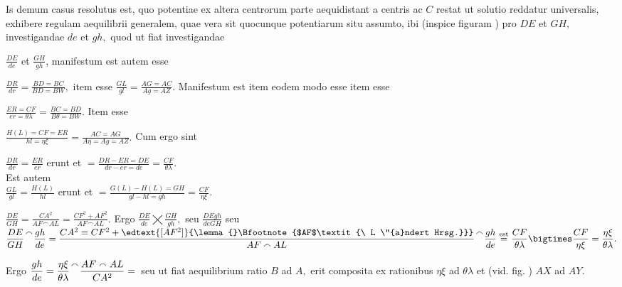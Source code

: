 \pstart
Is demum casus resolutus est, quo potentiae\protect{} ex altera centrorum parte aequidistant a centris ac $C$ restat ut solutio reddatur universalis, exhibere regulam aequilibrii\protect{} generalem, quae vera sit quocunque potentiarum\protect{} situ assumto, ibi (inspice figuram ) pro  $DE$ et $GH,$ investigandae $de$ et $gh,$ quod ut fiat investigandae \rule[-4mm]{0mm}{10mm}$\displaystyle\frac{DE}{de}$ et $\displaystyle\frac{GH}{gh}$, manifestum est autem esse \rule[-4mm]{0mm}{10mm}$\displaystyle\frac{DR}{dr}=\frac{BD=BC}{BD=BW},$ item esse $\displaystyle\frac{GL}{gl}=\frac{AG=AC}{Ag=AZ}.$ Manifestum est item eodem modo esse item esse \rule[-4mm]{0mm}{10mm}$\displaystyle\frac{ER=CF}{er=\theta\lambda}=\frac{BC=BD}{B\theta=BW}.$  
Item esse \rule[-4mm]{0mm}{10mm}$\displaystyle\frac{H(L)=CF=ER}{hl=\eta\xi}=\frac{AC=AG}{A\eta=Ag=AZ}.$
\pend
\pstart\noindent
\hspace*{0.7cm}Cum ergo sint \rule[-4mm]{0mm}{10mm}$\displaystyle\frac{DR}{dr}=\frac{ER}{er}$\hspace*{0.3cm} erunt et $\displaystyle=\frac{DR-ER=DE}{dr-er=de}=\frac{CF}{\theta\lambda}.$\\
\hspace*{11.5cm}Est autem\\
\hspace*{0.7cm} $\displaystyle\frac{GL}{gl}=\frac{H(L)}{hl}$ erunt et $\displaystyle=\frac{G(L)-H(L)=GH}{gl-hl=gh}=\frac{CF}{\eta\xi}.$
\pend
\vspace*{1mm}
\pstart \noindent
\rule[-4mm]{0mm}{10mm}$\displaystyle\frac{DE}{GH}=\frac{CA^2}{AF\smallfrown AL}=\frac{CF^2+AF^2}{AF\smallfrown AL}.$
Ergo $\displaystyle\frac{DE}{de}\bigtimes\frac{GH}{gh},$ seu $\displaystyle\frac{DEgh}{deGH}$ seu $\displaystyle\frac{DE}{GH}\efrac{\smallfrown}{}\frac{gh}{de}=\frac{CA^2=CF^2+\edtext{\lbrack AF^2\rbrack}{\lemma{}\Bfootnote{$AF$\textit{\ L \"{a}ndert Hrsg.}}}}{AF\smallfrown AL}\efrac{\smallfrown}{}\frac{gh}{de}\overset{\text{est}}=\frac{CF}{\theta\lambda}\bigtimes\frac{CF}{\eta\xi}=\frac{\eta\xi}{\theta\lambda}.$ 
\rule[-4mm]{0mm}{10mm}Ergo $\displaystyle\frac{gh}{de}=\frac{\eta\xi}{\theta\lambda}\efrac{\smallfrown}{}\frac{AF\smallfrown AL}{CA^2}=$\ 
seu ut fiat aequilibrium\protect{} ratio $B$ ad $A,$ erit composita ex rationibus $\eta\xi$ ad $\theta\lambda$ et (vid. fig. ) $AX$ ad $AY.$
